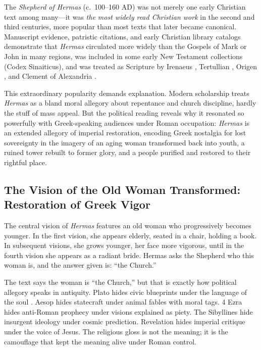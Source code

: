 The \emph{Shepherd of Hermas} (c.~100--160 AD) was not merely one early Christian text among many---it was \emph{the most widely read Christian work} in the second and third centuries, more popular than most texts that later became canonical.
Manuscript evidence, patristic citations, and early Christian library catalogs demonstrate that \emph{Hermas} circulated more widely than the Gospels of Mark or John in many regions, was included in some early New Testament collections (Codex Sinaiticus), and was treated as Scripture by Irenaeus \cite[4.20.2]{irenaeus:advhaer}, Tertullian \cite{tertullian:marcionem}, Origen \cite[4.2.4]{origen:principiis}, and Clement of Alexandria \cite[1.29]{clement:stromata}.

This extraordinary popularity demands explanation.
Modern scholarship treats \emph{Hermas} as a bland moral allegory about repentance and church discipline, hardly the stuff of mass appeal.
But the political reading reveals why it resonated so powerfully with Greek-speaking audiences under Roman occupation: \emph{Hermas} is an extended allegory of imperial restoration, encoding Greek nostalgia for lost sovereignty in the imagery of an aging woman transformed back into youth, a ruined tower rebuilt to former glory, and a people purified and restored to their rightful place.

\subsection{The Vision of the Old Woman Transformed: Restoration of Greek Vigor}

The central vision of \emph{Hermas} \cite[Vision 1--4]{shepherd:hermas} features an old woman who progressively becomes younger.
In the first vision, she appears elderly, seated in a chair, holding a book.
In subsequent visions, she grows younger, her face more vigorous, until in the fourth vision she appears as a radiant bride.
Hermas asks the Shepherd who this woman is, and the answer given is: ``the Church.''

The text says the woman is ``the Church,'' but that is exactly how political allegory speaks in antiquity.
Plato hides civic blueprints under the language of the soul \cite{plato:republic}.
Aesop hides statecraft under animal fables with moral tags.
4 Ezra \cite{fourezdras} hides anti-Roman prophecy under visions explained as piety.
The Sibyllines \cite{sibyllineoracles} hide insurgent ideology under cosmic prediction.
Revelation hides imperial critique under the voice of Jesus.
The religious gloss is not the meaning; it is the camouflage that kept the meaning alive under Roman control.

